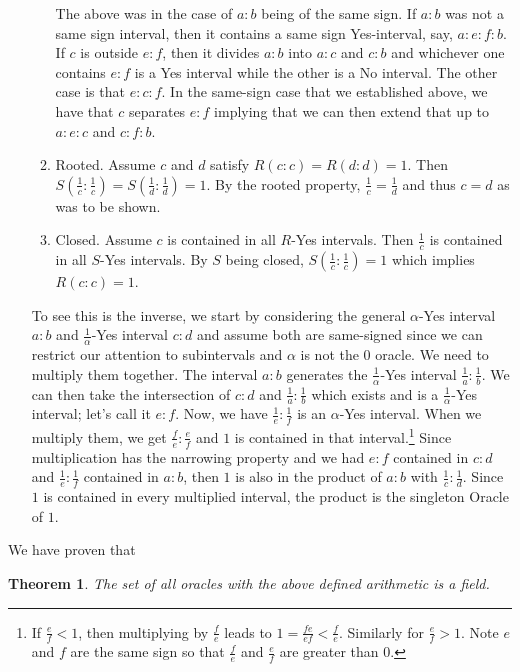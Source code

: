 \documentclass[12pt]{article}
\newtheorem{theorem}{Theorem}[subsection]
\theoremstyle{remark}
\begin{document}
\begin{itemize}
\begin{enumerate}
        The above was in the case of $a:b$ being of the same sign. If $a:b$ was not a same sign interval, then it contains a same sign Yes-interval, say, $a:e:f:b$. If $c$ is outside $e:f$, then it divides $a:b$ into $a:c$ and $c:b$ and whichever one contains $e:f$ is a Yes interval while the other is a No interval. The other case is that $e:c:f$. In the same-sign case that we established above, we have that $c$ separates $e:f$ implying that we can then extend that up to $a:e:c$ and $c:f:b$.
        \item Rooted. Assume $c$ and $d$ satisfy $R(c:c)=R(d:d)=1$. Then $S(\frac{1}{c}:\frac{1}{c})=S(\frac{1}{d}:\frac{1}{d})=1$. By the rooted property, $\frac{1}{c} = \frac{1}{d}$ and thus $c=d$ as was to be shown. 
        \item Closed. Assume $c$ is contained in all $R$-Yes intervals. Then $\frac{1}{c}$ is contained in all $S$-Yes intervals. By $S$ being closed, $S(\frac{1}{c}:\frac{1}{c})=1$ which implies $R(c:c)=1$.
    \end{enumerate}
    
    To see this is the inverse, we start by considering the general $\alpha$-Yes interval $a:b$ and $\frac{1}{\alpha}$-Yes interval $c:d$ and assume both are same-signed since we can restrict our attention to subintervals and $\alpha$ is not the 0 oracle. We need to multiply them together. The interval $a:b$ generates the $\frac{1}{\alpha}$-Yes interval $\frac{1}{a}:\frac{1}{b}$. We can then take the intersection of $c:d$ and $\frac{1}{a}:\frac{1}{b}$ which exists and is a $\frac{1}{\alpha}$-Yes interval; let's call it $e:f$. Now, we have $\frac{1}{e}:\frac{1}{f}$ is an $\alpha$-Yes interval. When we multiply them, we get $\frac{f}{e}:\frac{e}{f}$ and $1$ is  contained in that interval.\footnote{If $\frac{e}{f} <1$, then multiplying by $\frac{f}{e}$ leads to $1 = \frac{fe}{ef} < \frac{f}{e}$. Similarly for $\frac{e}{f} > 1$. Note $e$ and $f$ are the same sign so that $\frac{f}{e}$ and $\frac{e}{f}$ are greater than 0. } Since multiplication has the narrowing property and we had $e:f$ contained in $c:d$ and $\frac{1}{e}:\frac{1}{f}$ contained in $a:b$, then $1$ is also in the product of $a:b$ with $\frac{1}{c}:\frac{1}{d}$. Since $1$ is contained in every multiplied interval, the product is the singleton Oracle of $1$. 
    
\end{itemize}

We have proven that

\begin{theorem}
The set of all oracles with the above defined arithmetic is a field. 
\end{theorem}
\end{document}
